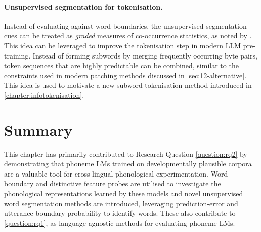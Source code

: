 \paragraph{Unsupervised segmentation for tokenisation.} Instead of evaluating against word boundaries, the unsupervised segmentation cues can be treated as \emph{graded} measures of co-occurrence statistics, as noted by \citet{elman-1990-finding}. This idea can be leveraged to improve the tokenisation step in modern LLM pre-training. Instead of forming subwords by merging frequently occurring byte pairs, token sequences that are highly predictable can be combined, similar to the constraints used in modern patching methods discussed in \cref{sec:12-alternative}. This idea is used to motivate a new subword tokenisation method introduced in \cref{chapter:infotokenisation}. 



\section{Summary}

This chapter has primarily contributed to Research Question \ref{question:rq2} by demonstrating that phoneme LMs trained on developmentally plausible corpora are a valuable tool for cross-lingual phonological experimentation. Word boundary and distinctive feature probes are utilised to investigate the phonological representations learned by these models and novel unsupervised word segmentation methods are introduced, leveraging prediction-error and utterance boundary probability to identify words. These also contribute to \ref{question:rq1}, as language-agnostic methods for evaluating phoneme LMs. 

